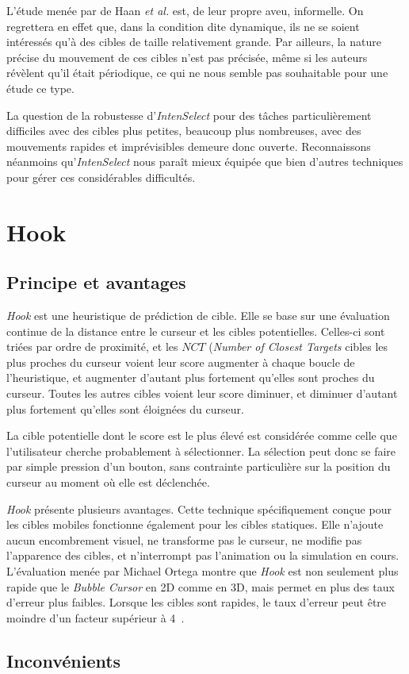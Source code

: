 	L'étude menée par de Haan \emph{et al.} est, de leur propre aveu, informelle. On regrettera en effet que, dans la condition dite dynamique, ils ne se soient intéressés qu'à des cibles de taille relativement grande. Par ailleurs, la nature précise du mouvement de ces cibles n'est pas précisée, même si les auteurs révèlent qu'il était périodique, ce qui ne nous semble pas souhaitable pour une étude ce type.
	
	La question de la robustesse d'\emph{IntenSelect} pour des tâches particulièrement difficiles avec des cibles plus petites, beaucoup plus nombreuses, avec des mouvements rapides et imprévisibles demeure donc ouverte. Reconnaissons néanmoins qu'\emph{IntenSelect} nous paraît mieux équipée que bien d'autres techniques pour gérer ces considérables difficultés.
		
\section{Hook}
	\subsection{Principe et avantages}
	\emph{Hook} est une heuristique de prédiction de cible. Elle se base sur une évaluation continue de la distance entre le curseur et les cibles potentielles. Celles-ci sont triées par ordre de proximité, et les $NCT$ (\emph{Number of Closest Targets} cibles les plus proches du curseur voient leur score augmenter à chaque boucle de l'heuristique, et augmenter d'autant plus fortement qu'elles sont proches du curseur. Toutes les autres cibles voient leur score diminuer, et diminuer d'autant plus fortement qu'elles sont éloignées du curseur.
		
	La cible potentielle dont le score est le plus élevé est considérée comme celle que l'utilisateur cherche probablement à sélectionner. La sélection peut donc se faire par simple pression d'un bouton, sans contrainte particulière sur la position du curseur au moment où elle est déclenchée.
		
	\emph{Hook} présente plusieurs avantages. Cette technique spécifiquement conçue pour les cibles mobiles fonctionne également pour les cibles statiques. Elle n'ajoute aucun encombrement visuel, ne transforme pas le curseur, ne modifie pas l'apparence des cibles, et n'interrompt pas l'animation ou la simulation en cours. L'évaluation menée par Michael Ortega montre que \emph{Hook} est non seulement plus rapide que le \emph{Bubble Cursor} en 2D comme en 3D, mais permet en plus des taux d'erreur plus faibles. Lorsque les cibles sont rapides, le taux d'erreur peut être moindre d'un facteur supérieur à 4~\cite{ortega2013hook}.
	
	\subsection{Inconvénients}

\clearpage
